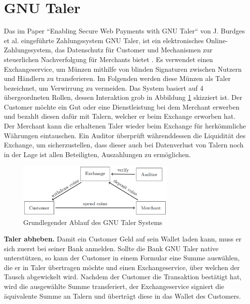 \documentclass[11pt,a4paper]{scrreprt}
\begin{document}
\section{GNU Taler}
\label{subsec:gnu}
Das im Paper ``Enabling Secure Web Payments with GNU Taler`` von J. Burdges et al. eingeführte Zahlungssystem GNU Taler, ist ein elektronisches Online-Zahlungssystem, das Datenschutz für Customer und Mechanismen zur steuerlichen Nachverfolgung für Merchants bietet \cite{gnu-burdges2016enabling}. Es verwendet einen Exchangeservice, um Münzen mithilfe von blinden Signaturen zwischen Nutzern und Händlern zu transferieren. Im Folgenden werden diese Münzen als Taler bezeichnet, um Verwirrung zu vermeiden. Das System basiert auf 4 übergeordneten Rollen, dessen Interaktion grob in Abbildung \ref{fig:gnu_taler_overview} skizziert ist. Der Customer möchte ein Gut oder eine Dienstleistung bei dem Merchant erwerben und bezahlt diesen dafür mit Talern, welcher er beim Exchange erworben hat. Der Merchant kann die erhaltenen Taler wieder beim Exchange für herkömmliche Währungen eintauschen. Ein Auditor überprüft währenddessen die Liquidität des Exchange, um sicherzustellen, dass dieser auch bei Datenverlust von Talern noch in der Lage ist allen Beteiligten, Auszahlungen zu ermöglichen.

\begin{figure}[H]
    \centering
    \includegraphics[width=0.7\textwidth]{gnu_system_graphic.png}
    \caption{Grundlegender Ablauf des GNU Taler Systems \cite{gnu-burdges2016enabling}}
    \label{fig:gnu_taler_overview}
\end{figure}

\textbf{Taler abheben.} Damit ein Customer Geld auf sein Wallet laden kann, muss er sich zuerst bei seiner Bank anmelden. Sollte die Bank GNU Taler native unterstützen, so kann der Customer in einem Formular eine Summe auswählen, die er in Taler übertragen möchte und einen Exchangeservice, über welchen der Tausch abgewickelt wird. Nachdem der Customer die Transaktion bestätigt hat, wird die ausgewählte Summe transferiert, der Exchangeservice signiert die äquivalente Summe an Talern und überträgt diese in das Wallet des Customers.\\
\end{document}
